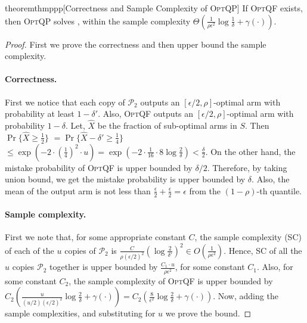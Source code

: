  \begin{restatable}{theorem}{thmppp}[Correctness and Sample Complexity of \textsc{OptQP}]
 \label{thm:ppp}
 If \textsc{OptQF} exists, then
 \textsc{OptQP}  solves \QP, within the sample complexity $\Theta\left(\frac{1}{\rho\epsilon^2}\log\frac{1}{\delta}+ \gamma(\cdot)\right)$.
 \end{restatable}
 \begin{proof}
 First we prove the correctness and then upper bound the sample complexity.
  \paragraph{Correctness.}  First we notice that each copy of $\mathcal{P}_2$ outputs an $[\epsilon/2, \rho]$-optimal arm
 with probability at least $1-\delta'$. Also, \textsc{OptQF} outputs an
 $[\epsilon/2, \rho]$-optimal arm with probability $1-\delta$.
 Let, $\hat{X}$ be the fraction of sub-optimal arms in $S$. Then $\Pr\{\hat{X} \geq \frac{1}{2}\}$ $= \Pr\{\hat{X} - \delta' \geq \frac{1}{4}\}$
  $\leq \exp(-2\cdot(\frac{1}{4})^2\cdot u) = \exp(-2\cdot\frac{1}{16}\cdot 8\log\frac{2}{\delta}) < \frac{\delta}{2}$. On the other hand, the mistake probability of \textsc{OptQF} is upper bounded by $\delta/2$. Therefore, by taking union bound, we get the 
  mistake probability is upper bounded by $\delta$. Also, the mean of the output arm is not
  less than $\frac{\epsilon}{2} + \frac{\epsilon}{2} = \epsilon$ from the $(1-\rho)$-th
  quantile.
  
  \paragraph{Sample complexity.} First we note that, for some appropriate constant $C$,
  the sample complexity (SC) of each of the $u$ copies of $\mathcal{P}_2$ is $\frac{C}{\rho(\epsilon/2)^2}\left(\log\frac{2}{\delta'}\right)^2 \in O\left(\frac{1}{\rho\epsilon^2}\right)$.
  Hence, SC of all the $u$ copies $\mathcal{P}_2$ together is upper bounded by $\frac{C_1\cdot u}{\rho\epsilon^2}$, for some constant $C_1$.
  Also, for some constant $C_2$, the sample complexity of \textsc{OptQF} is upper bounded by $C_2 \left(\frac{u}{(u/2) (\epsilon/2)^2}\log\frac{2}{\delta} + \gamma(\cdot)\right) = C_2 \left(\frac{8}{\epsilon^2}\log\frac{2}{\delta}+ \gamma(\cdot)\right)$.
  Now, adding the sample complexities, and substituting for $u$ we prove the bound.
 \end{proof}
 
